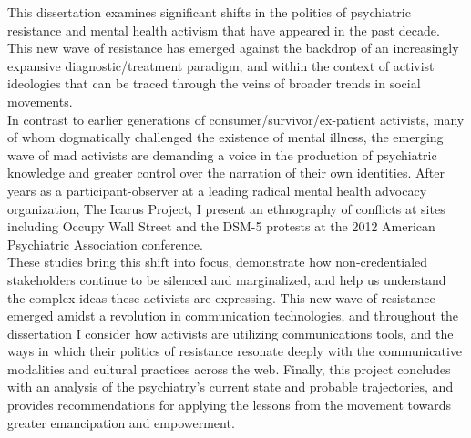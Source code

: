 %


\hfill
\vfill

\begingroup
\endgroup 

\bigskip


\begin{quoting}[indentfirst=false,leftmargin=3em]
	This dissertation examines significant shifts in the politics of psychiatric resistance and mental health activism that have appeared in the past decade. This new wave of resistance has emerged against the backdrop of an increasingly expansive diagnostic/treatment paradigm, and within the context of activist ideologies that can be traced through the veins of broader trends in social movements.\\

	\noindent
	In contrast to earlier generations of consumer/survivor/ex-patient activists, many of whom dogmatically challenged the existence of mental illness, the emerging wave of mad activists are demanding a voice in the production of psychiatric knowledge and greater control over the narration of their own identities. After years as a participant-observer at a leading radical mental health advocacy organization, The Icarus Project, I present an ethnography of conflicts at sites including Occupy Wall Street and the DSM-5 protests at the 2012 American Psychiatric Association conference.\\

	\noindent
	These studies bring this shift into focus, demonstrate how non-credentialed stakeholders continue to be silenced and marginalized, and help us understand the complex ideas these activists are expressing. This new wave of resistance emerged amidst a revolution in communication technologies, and throughout the dissertation I consider how activists are utilizing communications tools, and the ways in which their politics of resistance resonate deeply with the communicative modalities and cultural practices across the web. Finally, this project concludes with an analysis of the psychiatry’s current state and probable trajectories, and provides recommendations for applying the lessons from the movement towards greater emancipation and empowerment.
\end{quoting}


